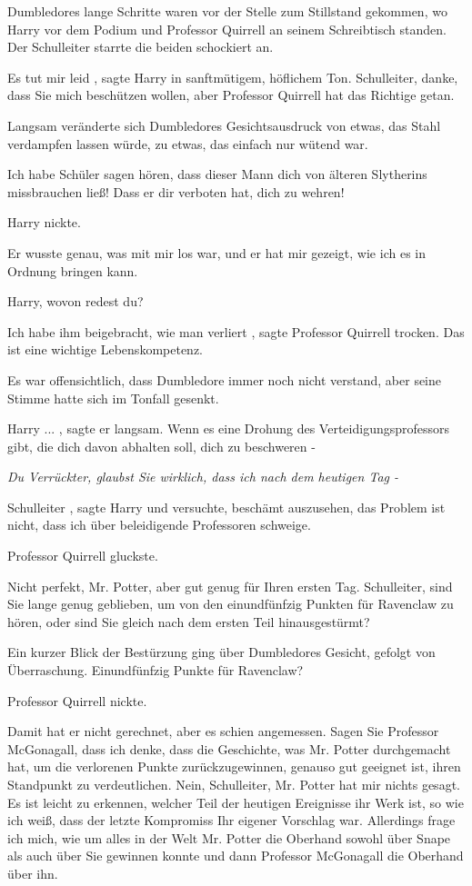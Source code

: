 Dumbledores lange Schritte waren vor der Stelle zum Stillstand gekommen, wo
Harry vor dem Podium und Professor Quirrell an seinem Schreibtisch standen. Der
Schulleiter starrte die beiden schockiert an.

\glqq Es tut mir leid\grqq{} , sagte Harry in sanftmütigem, höflichem Ton. \glqq
Schulleiter, danke, dass Sie mich beschützen wollen, aber Professor Quirrell hat
das Richtige getan.\grqq{}

Langsam veränderte sich Dumbledores Gesichtsausdruck von etwas, das Stahl
verdampfen lassen würde, zu etwas, das einfach nur wütend war.

\glqq Ich habe Schüler sagen hören, dass dieser Mann dich von älteren Slytherins
missbrauchen ließ! Dass er dir verboten hat, dich zu wehren!\grqq{}

Harry nickte.

\glqq Er wusste genau, was mit mir los war, und er hat mir gezeigt, wie ich es
in Ordnung bringen kann.\grqq{}

\glqq Harry, wovon redest du?\grqq{}

\glqq Ich habe ihm beigebracht, wie man verliert\grqq{} , sagte Professor
Quirrell trocken. \glqq Das ist eine wichtige Lebenskompetenz.\grqq{}

Es war offensichtlich, dass Dumbledore immer noch nicht verstand, aber seine
Stimme hatte sich im Tonfall gesenkt.

\glqq Harry ...\grqq{} , sagte er langsam. \glqq Wenn es eine Drohung des
Verteidigungsprofessors gibt, die dich davon abhalten soll, dich zu beschweren
-\grqq{}

\emph{ Du Verrückter, glaubst Sie wirklich, dass ich nach dem heutigen Tag -}

\glqq Schulleiter\grqq{} , sagte Harry und versuchte, beschämt auszusehen, \glqq
das Problem ist nicht, dass ich über beleidigende Professoren schweige.\grqq{}

Professor Quirrell gluckste.

\glqq Nicht perfekt, Mr. Potter, aber gut genug für Ihren ersten Tag.
Schulleiter, sind Sie lange genug geblieben, um von den einundfünfzig Punkten
für Ravenclaw zu hören, oder sind Sie gleich nach dem ersten Teil
hinausgestürmt?\grqq{}

Ein kurzer Blick der Bestürzung ging über Dumbledores Gesicht, gefolgt von
Überraschung. \glqq Einundfünfzig Punkte für Ravenclaw?\grqq{}

Professor Quirrell nickte.

\glqq Damit hat er nicht gerechnet, aber es schien angemessen. Sagen Sie
Professor McGonagall, dass ich denke, dass die Geschichte, was Mr. Potter
durchgemacht hat, um die verlorenen Punkte zurückzugewinnen, genauso gut
geeignet ist, ihren Standpunkt zu verdeutlichen. Nein, Schulleiter, Mr. Potter
hat mir nichts gesagt. Es ist leicht zu erkennen, welcher Teil der heutigen
Ereignisse ihr Werk ist, so wie ich weiß, dass der letzte Kompromiss Ihr eigener
Vorschlag war. Allerdings frage ich mich, wie um alles in der Welt Mr. Potter
die Oberhand sowohl über Snape als auch über Sie gewinnen konnte und dann
Professor McGonagall die Oberhand über ihn.\grqq{}

